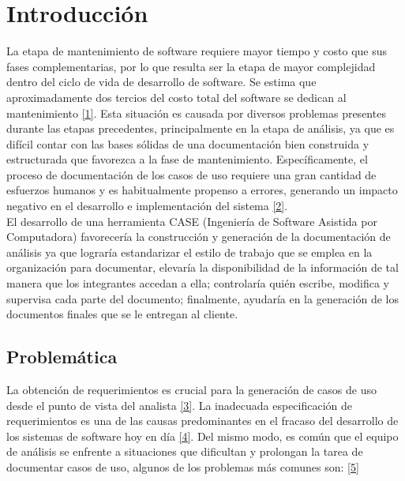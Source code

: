 

\chapter{Introducción}

La etapa de mantenimiento de software requiere mayor tiempo y costo que sus fases complementarias, por lo que resulta ser la etapa de mayor complejidad dentro del ciclo de vida de desarrollo de software. Se estima que aproximadamente dos tercios del costo total del software se dedican al mantenimiento \hyperlink{b01}{[1]}. Esta situación es causada por diversos problemas presentes durante las etapas precedentes, principalmente en la etapa de análisis, ya que es difícil contar con las bases sólidas de una documentación bien construida y estructurada que favorezca a la fase de  mantenimiento. Específicamente, el proceso de documentación de los casos de uso requiere una gran cantidad de esfuerzos humanos y es habitualmente propenso a errores, generando un impacto negativo en el desarrollo e implementación del sistema \hyperlink{b02}{[2]}. \\

El desarrollo de una herramienta  CASE (Ingeniería de Software Asistida por Computadora) favorecería la construcción y generación de la documentación de análisis ya que lograría estandarizar el estilo de trabajo que se emplea en la organización para documentar, elevaría la disponibilidad de la información de tal manera que los integrantes accedan a ella; controlaría quién escribe, modifica y supervisa cada parte del documento; finalmente, ayudaría en la generación de los documentos finales que se le entregan al cliente.

\newpage
\section{Problemática}

La obtención de requerimientos es crucial para la generación de casos de uso desde el punto de vista del analista \hyperlink{b03}{[3]}. La inadecuada especificación de requerimientos es una de las causas predominantes en el fracaso del desarrollo de los sistemas de software hoy en día \hyperlink{b04}{[4]}. Del mismo modo, es común que el equipo de análisis se enfrente a situaciones que dificultan y prolongan la tarea de documentar casos de uso, algunos de los problemas más comunes son: \hyperlink{b05}{[5]}

